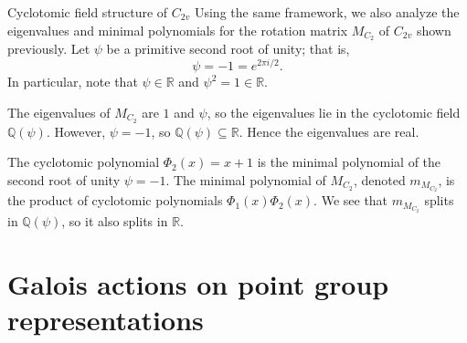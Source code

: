 \documentclass{beamer}
\newcommand{\vs}{\vspace{5mm}}
\begin{document}
    \begin{frame}{Cyclotomic field structure of $C_{2v}$}
        Using the same framework, we also analyze the eigenvalues and minimal polynomials for the rotation matrix $M_{C_2}$ of $C_{2v}$ shown previously. Let $\psi$ be a primitive second root of unity; that is,
        \[\psi=-1=e^{2\pi i/2}.\]
        In particular, note that $\psi\in\mathbb{R}$ and $\psi^2=1\in\mathbb{R}$.
        \vs
    
        The eigenvalues of $M_{C_2}$ are $1$ and $\psi$, so the eigenvalues lie in the cyclotomic field $\mathbb{Q}(\psi)$. However, $\psi=-1$, so $\mathbb{Q}(\psi)\subseteq\mathbb{R}$. Hence the eigenvalues are real.
        \vs
        
        The cyclotomic polynomial $\Phi_2(x)=x+1$ is the minimal polynomial of the second root of unity $\psi=-1$. The minimal polynomial of $M_{C_2}$, denoted $m_{M_{C_2}}$, is the product of cyclotomic polynomials $\Phi_1(x)\Phi_2(x)$. We see that $m_{M_{C_2}}$ splits in $\mathbb{Q}(\psi)$, so it also splits in $\mathbb{R}$.
    \end{frame}
    
    \section{Galois actions on point group representations}
    
\end{document}
